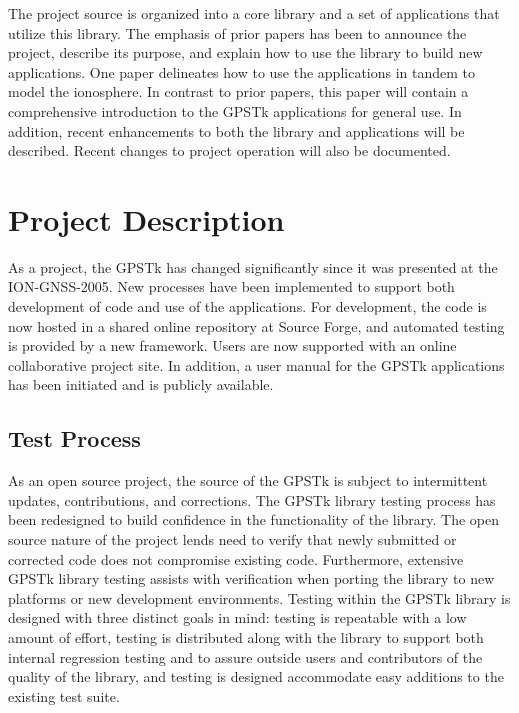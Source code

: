 \documentclass{ion-gps}
\begin{document}
The project source is organized into a core library and a set of
applications that utilize this library. The emphasis of prior papers
has been to announce the project, describe its purpose, and explain how to use
the library to build new applications\cite{ion:gnss04, lj04}. One
paper delineates how to use the applications in tandem to model the
ionosphere\cite{beacon04}. In contrast to prior papers, this
paper will contain a comprehensive introduction to the GPSTk
applications for general use. In addition, recent enhancements to both
the library and applications will be described.  Recent changes to
project operation will also be documented.

\section*{Project Description}

As a project, the GPSTk has changed significantly since it was
presented at the ION-GNSS-2005. New processes have been implemented to
support both development of code and use of the
applications. For development, the code is now hosted in a shared 
online repository at Source Forge\cite{sourceforge}, and automated testing
is provided by a new framework. Users are now supported with an online collaborative
project site. In addition, a user manual for the GPSTk applications
has been initiated and is publicly available.

\subsection*{Test Process}

As an open source project, the source of the GPSTk is subject to
intermittent updates, contributions, and corrections. The GPSTk
library testing process has been redesigned to build confidence in the
functionality of the library.  The open source nature of the project lends
need to verify that newly submitted or corrected code does not
compromise existing code. Furthermore, extensive GPSTk library testing
assists with verification when porting the library to new platforms or
new development environments. Testing within the GPSTk library is
designed with three distinct goals in mind: testing is repeatable with
a low amount of effort, testing is distributed along with the library
to support both internal regression testing and to assure outside
users and contributors of the quality of the library, and testing is
designed accommodate easy additions to the existing test suite.
\end{document}
